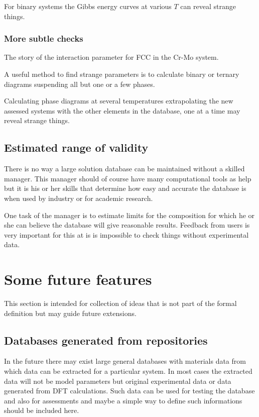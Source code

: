 \documentclass[12pt]{article}
\begin{document}
For binary systems the Gibbs energy curves at various $T$ can reveal
strange things.

\subsubsection{More subtle checks}

The story of the interaction parameter for FCC in the Cr-Mo system.

A useful method to find strange parameters is to calculate binary or
ternary diagrams suspending all but one or a few phases.

Calculating phase diagrams at several temperatures extrapolating the
new assessed systems with the other elements in the database, one at a
time may reveal strange things.

\subsection{Estimated range of validity}

There is no way a large solution database can be maintained without a
skilled manager.  This manager should of course have many
computational tools as help but it is his or her skills that determine
how easy and accurate the database is when used by industry or for
academic research.

One task of the manager is to estimate limits for the composition for
which he or she can believe the database will give reasonable results.
Feedback from users is very important for this at is is impossible to
check things without experimental data.

\section{Some future features}

This section is intended for collection of ideas that is not part of
the formal definition but may guide future extensions.

\subsection{Databases generated from repositories}

In the future there may exist large general databases with materials
data from which data can be extracted for a particular system.  In
most cases the extracted data will not be model parameters but
original experimental data or data generated from DFT calculations.
Such data can be used for testing the database and also for
assessments and maybe a simple way to define such informations should
be included here.
\end{document}
